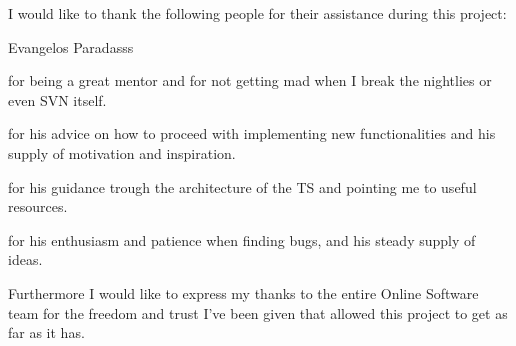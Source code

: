 I would like to thank the following people for their assistance during this
project:\\

\begin{labeling}{Evangelos Paradasss}
\item [\textbf{Christos Lazaridis}] for being a great mentor and for not getting mad
when I break the nightlies or even SVN itself.\\
\item [\textbf{Alessandro Thea}] for his advice on how to proceed with implementing new
functionalities and his supply of motivation and inspiration.\\
\item [\textbf{Evangelos Paradas}] for his guidance trough the architecture of the TS
and pointing me to useful resources.\\
\item [\textbf{Simone Bologna}] for his enthusiasm and patience when finding bugs,
and his steady supply of ideas.
\end{labeling}

Furthermore I would like to express my thanks to the entire Online Software team
for the freedom and trust I've been given that allowed this project to get as
far as it has.
